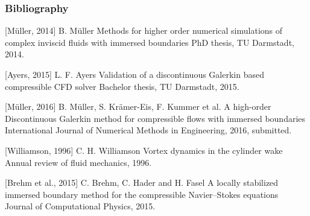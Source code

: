 \documentclass[accentcolor=tud7b,colorbacktitle,inverttitle,landscape,presentation,t]{tudbeamer}
\begin{document}
\begin{frame}[allowframebreaks]
	\frametitle{Bibliography}
\begin{thebibliography}{8}
	[Müller, 2014]
	B. Müller
	\newblock Methods for higher order numerical simulations of complex inviscid fluids with immersed boundaries
	\newblock PhD thesis, TU Darmstadt, 2014.
	
	[Ayers, 2015]
	L. F. Ayers
	\newblock Validation of a discontinuous Galerkin based compressible CFD solver
	\newblock Bachelor thesis, TU Darmstadt, 2015.
	
	[Müller, 2016]
	B. Müller, S. Krämer-Eis, F. Kummer et al.
	\newblock A high-order Discontinuous Galerkin method for compressible flows with immersed boundaries
	\newblock International Journal of Numerical Methods in Engineering, 2016, submitted.
	
	[Williamson, 1996]
	C. H. Williamson
	\newblock Vortex dynamics in the cylinder wake
	\newblock Annual review of fluid mechanics, 1996.
	
	[Brehm et al., 2015]
	C. Brehm, C. Hader and H. Fasel
	\newblock A locally stabilized immersed boundary method for the compressible {N}avier--{S}tokes equations
	\newblock Journal of Computational Physics, 2015.
\end{thebibliography}
\end{frame}

\end{document}
